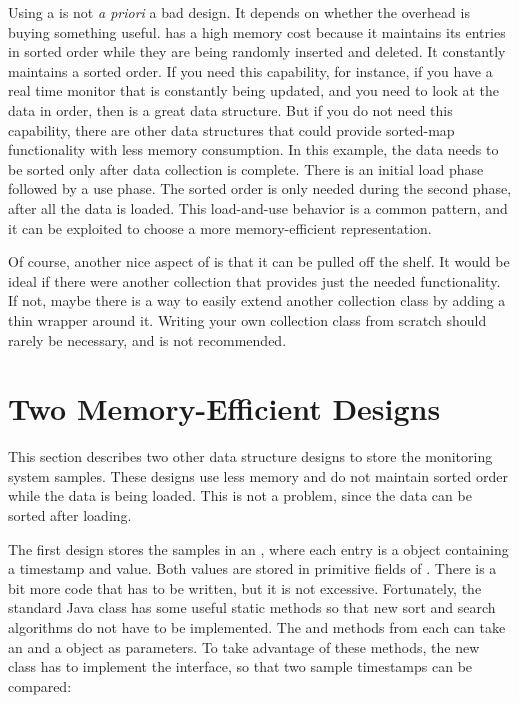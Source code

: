 Using a  is not \textit{a priori} a bad design. It depends on
whether the overhead is buying something useful.  has a high
memory cost because it maintains its entries in sorted order while they are
being randomly inserted and deleted. It constantly maintains a sorted order. If
you need this capability, for instance, if you have a real time monitor that is
constantly being updated, and you need to look at the data in order, then
 is a great data structure.  But if you do not need
this capability, there are other data structures that could provide sorted-map
functionality with less memory consumption. In this example, the data needs to
be sorted only after data collection is complete. There is an initial load phase
followed by a use phase. The sorted order is only needed during the second
phase, after all the data is loaded. This load-and-use behavior is a common
pattern, and it can be exploited to choose a more memory-efficient
representation.

Of course, another nice aspect of  is that it can be pulled off
the shelf. It would be ideal if there were another collection that provides just
the needed functionality. If not, maybe there is a way to easily extend another
collection class by adding a thin wrapper around it. Writing your own collection
class from scratch should rarely be necessary, and is not recommended.

\section{Two Memory-Efficient Designs}
\label{sec:better-designs} 

This section describes two other data structure designs to store the monitoring
system samples. These designs use less memory and do not maintain sorted order
while the data is being loaded. This is not a problem, since the data can be
sorted after loading.

The first design stores the samples in an , where each entry
is a  object containing a timestamp and value. Both values are
stored in primitive  fields of .  There is a bit
more code that has to be written, but it is not excessive. Fortunately, the
standard Java  class has some useful static methods so that
new sort and search algorithms do not have to be implemented. The 
and  methods from  each can take an
 and a  object as parameters. To take
advantage of these methods, the new  class has to implement the
 interface, so that two sample timestamps can be compared:

